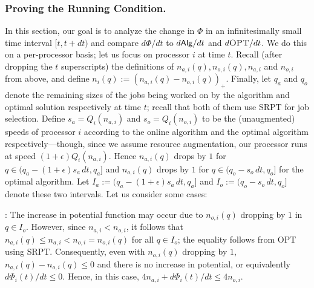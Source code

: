 \documentclass[11pt]{article}
\newcommand{\opt}{\textrm{\sc OPT}\xspace}
\newcommand{\alg}{\ensuremath{{\sf Alg}}\xspace}
\newcommand{\dphidtside}{d \Phi_i(t)/dt}
\begin{document}
\subsubsection{Proving the Running Condition.}
In this section, our goal is to analyze the change in $\Phi$ in an
infinitesimally small time interval $[t, t+ dt)$ and compare $d\Phi/dt$
to $d\alg/dt$ and $d\opt/dt$. We do this on a per-processor basis; let
us focus on processor $i$ at time $t$. Recall (after dropping the $t$ superscripts) the definitions of
$n_{a,i}(q), n_{o,i}(q), n_{a,i}$ and $n_{o,i}$ from above, and define
$n_i(q) := (n_{a,i}(q) - n_{o,i}(q))_+$. Finally, let $q_a$ and $q_o$
denote the remaining sizes of the jobs being worked on by the algorithm
and optimal solution respectively at time $t$; recall that both of them
use SRPT for job selection.  Define $s_a = Q_i(n_{a,i})$ and $s_o =
Q_i(n_{o,i})$ to be the (unaugmented) speeds of processor $i$
according to the online algorithm and the optimal algorithm
respectively---though, since we assume resource augmentation, our
processor runs at speed $(1+ \epsilon) Q_i(n_{a,i})$.  Hence
$n_{a,i}(q)$ drops by $1$ for $q \in (q_a - (1+\epsilon) s_a \,dt, q_a]$
and $n_{o,i}(q)$ drops by $1$ for $q \in (q_o - s_o \,dt, q_o]$ for the
optimal algorithm. Let $I_a := (q_a - (1+\epsilon) s_a \,dt, q_a]$ and
$I_o := (q_o - s_o \,dt, q_o]$ denote these two intervals. Let us consider
some cases:



\medskip {}: The increase in
potential function may occur due to $n_{o,i}(q)$ dropping by $1$ in $q
\in I_o$. However, since $n_{a,i} < n_{o,i}$, it follows that
$n_{a,i}(q) \leq n_{a,i} < n_{o,i} = n_{o,i}(q)$ for all $q \in I_o$;
the equality follows from \opt using SRPT.  Consequently, even with
$n_{o,i}(q)$ dropping by $1$, $n_{a,i}(q) - n_{o,i}(q) \leq 0$ and there
is no increase in potential, or equivalently $\dphidtside \leq 0$.
Hence, in this case, $4 n_{a,i} + \dphidtside \leq 4 n_{o,i}$.
\end{document}
